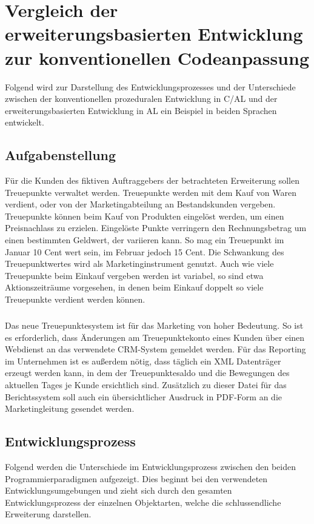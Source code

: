 \chapter{Vergleich der erweiterungsbasierten Entwicklung zur konventionellen Codeanpassung}
\label{cha:Vergleich}

Folgend wird zur Darstellung des Entwicklungsprozesses und der Unterschiede zwischen der konventionellen prozeduralen Entwicklung in C/AL und der erweiterungsbasierten Entwicklung in AL ein Beispiel in beiden Sprachen entwickelt.


\section{Aufgabenstellung}
\label{sec:Aufgabenstellung}

Für die Kunden des fiktiven Auftraggebers der betrachteten Erweiterung sollen Treuepunkte verwaltet werden. Treuepunkte werden mit dem Kauf von Waren verdient, oder von der Marketingabteilung an Bestandskunden vergeben. Treuepunkte können beim Kauf von Produkten eingelöst werden, um einen Preisnachlass zu erzielen. Eingelöste Punkte verringern den Rechnungsbetrag um einen bestimmten Geldwert, der variieren kann. So mag ein Treuepunkt im Januar 10 Cent wert sein, im Februar jedoch 15 Cent. Die Schwankung des Treuepunktwertes wird als Marketinginstrument genutzt. Auch wie viele Treuepunkte beim Einkauf vergeben werden ist variabel, so sind etwa Aktionszeiträume vorgesehen, in denen beim Einkauf doppelt so viele Treuepunkte verdient werden können.

\paragraph{}
Das neue Treuepunktesystem ist für das Marketing von hoher Bedeutung. So ist es erforderlich, dass Änderungen am Treuepunktekonto eines Kunden über einen Webdienst an das verwendete CRM-System gemeldet werden. Für das Reporting im Unternehmen ist es außerdem nötig, dass täglich ein XML Datenträger erzeugt werden kann, in dem der Treuepunktesaldo und die Bewegungen des aktuellen Tages je Kunde ersichtlich sind. Zusätzlich zu dieser Datei für das Berichtssystem soll auch ein übersichtlicher Ausdruck in PDF-Form an die Marketingleitung gesendet werden.
\pagebreak

\section{Entwicklungsprozess}
\label{sec:Entwicklungsprozess}
Folgend werden die Unterschiede im Entwicklungsprozess zwischen den beiden Programmierparadigmen aufgezeigt. Dies beginnt bei den verwendeten Entwicklungsumgebungen und zieht sich durch den gesamten Entwicklungsprozess der einzelnen Objektarten, welche die schlussendliche Erweiterung darstellen.

